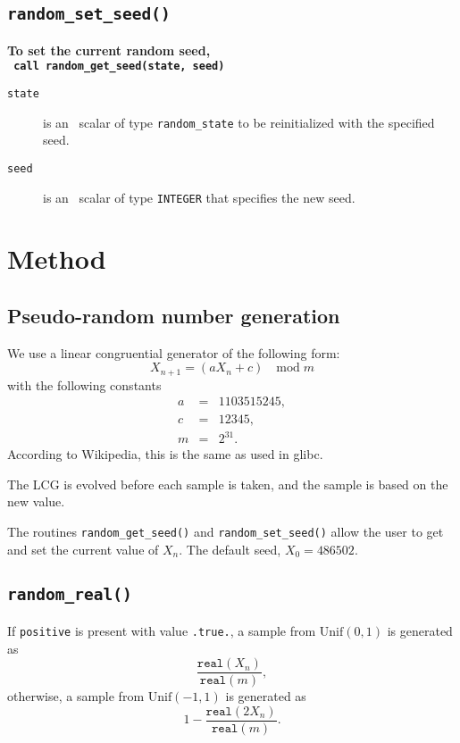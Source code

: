 \subsection{\texttt{random\_set\_seed()}}

\textbf{\noindent
   To set the current random seed,
   \vspace*{0.1cm} \\
   \texttt{ \hspace*{0.2cm}
      call random\_get\_seed(state, seed)
   }
   \vspace{0.3cm}
}

\begin{description}

\item[\texttt{state}] is an \intentinout\ scalar of type {\tt random\_state} to
   be reinitialized with the specified seed.

\item[\texttt{seed}] is an \intentin\ scalar of type {\tt INTEGER} that
   specifies the new seed.

\end{description}

\section{Method} \label{method}

\subsection{Pseudo-random number generation}
We use a linear congruential generator of the following form:
$$
   X_{n+1} = (aX_n + c)\quad \mathrm{mod}\; m
$$
with the following constants
\begin{eqnarray*}
   a &=& 1103515245, \\
   c &=& 12345, \\
   m &=& 2^{31}.
\end{eqnarray*}
According to Wikipedia, this is the same as used in glibc.

The LCG is evolved before each sample is taken, and the sample is based on the
new value.

The routines {\tt random\_get\_seed()} and {\tt random\_set\_seed()} allow the user to get and set the current value of $X_n$. The default seed, $X_0 = 486502$.

\subsection{\tt random\_real()}
If {\tt positive} is present with value {\tt .true.}, a sample from $\mathrm{Unif}(0,1)$ is generated as
$$
   \frac{\texttt{real}(X_n)}{\texttt{real}(m)},
$$
otherwise, a sample from $\mathrm{Unif}(-1,1)$ is generated as
$$
   1 - \frac{\texttt{real}(2X_n)}{\texttt{real}(m)}.
$$

